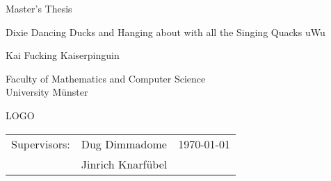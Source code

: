 

\usepackage[a4paper, margin=4cm, left=3cm, right=3cm]{geometry}


    \begin{titlepage}
        \setlength{\parindent}{0pt}

        \begin{center}
            \vspace*{12em}

            Master's Thesis

            \vspace*{3em}

            {\Huge{Dixie Dancing Ducks and Hanging about with all the Singing Quacks uWu}}

            \vspace*{\fill}

            {\Large{Kai Fucking Kaiserpinguin}}

            \vspace*{3em}

            Faculty of Mathematics and Computer Science \\
            University Münster

            \vspace*{1em}

            LOGO
        \end{center}

        \vspace*{8em}

        \begin{tabularx}{\textwidth}{l l >{\raggedleft\arraybackslash}X}
            Supervisors: & Dug Dimmadome     & \today \\
                        & Jinrich Knarfübel & \\
        \end{tabularx}
    \end{titlepage}
